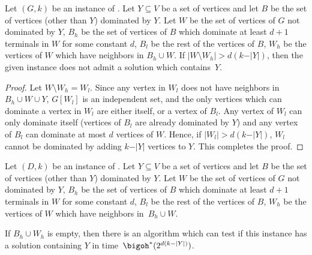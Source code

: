 \begin{lemma}\label{lem:base_case_domset}
 Let $(G,k)$ be an instance of {\ds}. Let $Y\subseteq V$ be a set of vertices and let $B$ be the set of vertices (other than $Y$) dominated by $Y$. Let $W$ be the set of vertices of $G$ not dominated by $Y$, $B_h$ be the set of vertices of $B$ which dominate at least $d+1$ terminals in $W$ for some constant $d$, $B_l$ be the rest of the vertices of $B$, $W_h$ be the vertices of $W$ which have neighbors in $B_h\cup W$. If $\vert W\setminus W_h\vert >d(k-\vert Y\vert)$, then the given instance does not admit a solution which contains~$Y$.
\end{lemma}
\begin{proof}
Let $W\setminus W_h=W_l$. Since any vertex in $W_l$ does not have neighbors in $B_h\cup W\cup Y$, $G[W_l]$ is an independent set, and the only vertices which can dominate a vertex in $W_l$ are either itself, or a vertex of $B_l$. Any vertex of $W_l$ can only dominate itself (vertices of $B_l$ are already dominated by $Y$) and any vertex of $B_l$ can dominate at most $d$ vertices of $W$. Hence, if $\vert W_l\vert>d(k-\vert Y\vert)$, $W_l$ cannot be dominated by adding $k-\vert Y\vert$ vertices to $Y$. This completes the proof.  
\end{proof}






\begin{lemma}\label{lem:base_case_nederlof_domset}
 Let $(D,k)$ be an instance of {\ds}. 
Let $Y\subseteq V$ be a set of vertices and let $B$ be the set of vertices (other than $Y$) dominated by $Y$. Let $W$ be the set of vertices of $G$ not dominated by $Y$, $B_h$ be the set of vertices of $B$ which dominate at least $d+1$ terminals in $W$ for some constant $d$, $B_l$ be the rest of the vertices of $B$, $W_h$ be the vertices of $W$ which have neighbors in~$B_h\cup W$.

If $B_h\cup W_h$ is empty, then there is an algorithm which can test if this instance has a solution containing $Y$ in time~$\bigoh^*(2^{d(k-|Y|)})$.
\end{lemma}


